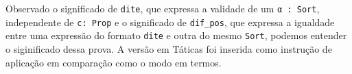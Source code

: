 Observado o significado de \lstinline{dite}, que expressa a validade de um 
\lstinline{α : Sort}, independente de \lstinline{c: Prop} e o significado 
de \lstinline{dif_pos}, que expressa a igualdade entre uma expressão do formato 
\lstinline{dite} e outra do mesmo \lstinline{Sort}, podemos entender o siginificado
dessa prova. A versão em Táticas foi inserida como instrução de aplicação em comparação
como o modo em termos. 